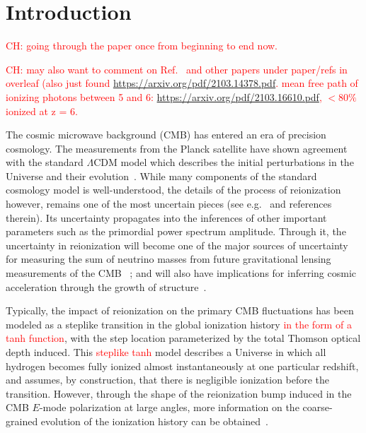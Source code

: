 \documentclass[prd,twocolumn,amsmath,amssymb,floatfix,superscriptaddress,nofootinbib]{revtex4-1}
\newcommand{\ch}[1]{\textcolor{red}{#1}}
\begin{document}
\maketitle




\section{Introduction}
\label{sec:intro}

\ch{CH: going through the paper once from beginning to end now.}

\ch{CH: may also want to comment on Ref.~\cite{Paoletti:2020ndu} and other papers under paper/refs in overleaf (also just found \url{https://arxiv.org/pdf/2103.14378.pdf}. mean free path of ionizing photons  between 5 and 6: \url{https://arxiv.org/pdf/2103.16610.pdf}, $<80\%$ ionized at z = 6. }

The cosmic microwave background (CMB) has entered an era of precision cosmology. The measurements from the Planck satellite have shown agreement with the standard $\Lambda$CDM model which describes the initial perturbations in the Universe and their evolution~\cite{Aghanim:2018eyx}. While many components of the standard cosmology model is well-understood, the details of the process of reionization however, remains one of the most uncertain pieces (see e.g.~\cite{2016ASSL..423.....M} and references therein). Its uncertainty propagates into the inferences of other important parameters such as the primordial power spectrum amplitude. Through it, the uncertainty in reionization will become one of the major sources of uncertainty for measuring the sum of neutrino masses from future gravitational lensing measurements of the CMB~ \cite{Smith:2006nk,Allison:2015qca}; and will also have implications for inferring cosmic acceleration through the growth of structure~\cite{Hu:2003pt}. 

Typically, the impact of reionization on the primary CMB fluctuations has been modeled as a steplike transition in the global ionization history \ch{in the form of a tanh function}, with the step location parameterized by the total Thomson optical depth induced. This \ch{steplike tanh} model describes a Universe in which all hydrogen becomes fully ionized almost instantaneously at one particular redshift, and assumes, by construction, that there is negligible ionization before the transition. However, through the shape of the reionization bump induced in the CMB $E$-mode polarization at large angles, more information on the coarse-grained evolution of the ionization history can be obtained~\cite{Hu:2003gh, Mortonson:2007hq}. 
\end{document}
